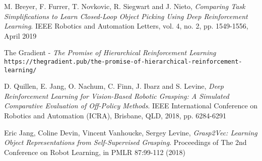 \documentclass[11pt,a4paper]{article}
\begin{document}
\begin{thebibliography}{9}
M. Breyer, F. Furrer, T. Novkovic, R. Siegwart and J. Nieto, 
\textit{Comparing Task Simplifications to Learn Closed-Loop Object Picking Using Deep Reinforcement Learning}. 
IEEE Robotics and Automation Letters, vol. 4, no. 2, pp. 1549-1556, April 2019

The Gradient - \textit{The Promise of Hierarchical Reinforcement Learning}
\\\texttt{https://thegradient.pub/the-promise-of-hierarchical-reinforcement-learning/}

D. Quillen, E. Jang, O. Nachum, C. Finn, J. Ibarz and S. Levine, 
\textit{Deep Reinforcement Learning for Vision-Based Robotic Grasping: A Simulated Comparative Evaluation of Off-Policy Methods}.
IEEE International Conference on Robotics and Automation (ICRA), Brisbane, QLD, 2018, pp. 6284-6291

Eric Jang, Coline Devin, Vincent Vanhoucke, Sergey Levine, 
\textit{Grasp2Vec: Learning Object Representations from Self-Supervised Grasping}.
Proceedings of The 2nd Conference on Robot Learning, in PMLR 87:99-112 (2018)
\end{thebibliography}
\end{document}
